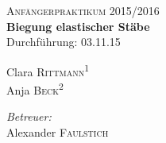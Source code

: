 \begin{titlepage}
\ \\
[1cm]
	\par
	\hfill
	\par
\begin{center}
\ \\
[5cm]
	\textsc{\Huge Anfängerpraktikum 2015/2016} \\
[2cm]
	\textbf{\Huge Biegung elastischer Stäbe} \\
[1cm]
	{\large Durchführung: 03.11.15} \\
[4cm]
\begin{minipage}{0.4\textwidth}
	\begin{flushleft} \large
		Clara \textsc{Rittmann}\textsuperscript{1} \\
		Anja \textsc{Beck}\textsuperscript{2}
	\end{flushleft}
\end{minipage}
\hfill
\begin{minipage}{0.4\textwidth}
	\begin{flushright} \large
		\emph{Betreuer:} \\
		Alexander \textsc{Faulstich}
	\end{flushright}
\end{minipage}
\end{center}
\end{titlepage}
